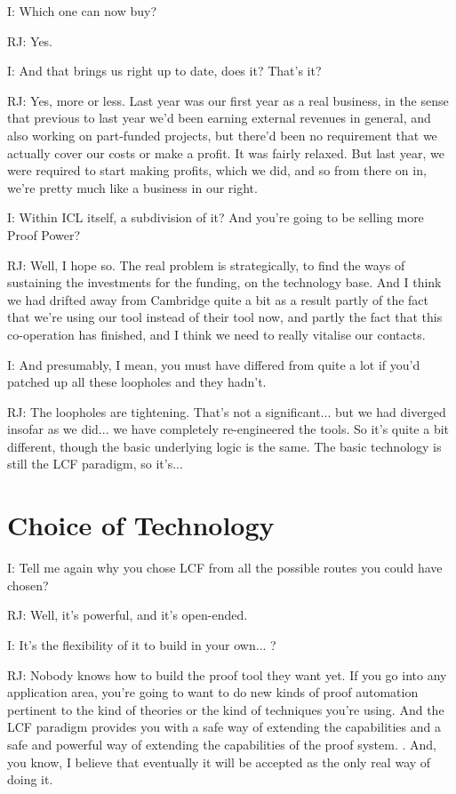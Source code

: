 \documentclass[10pt,titlepage]{book}
\begin{document}
I: Which one can now buy?

RJ: Yes.

I: And that brings us right up to date, does it?
That's it?


RJ: Yes, more or less. Last year was our first year as a real business, in the sense that  previous to last year we'd been earning external revenues in general, and also working on part-funded projects, but there'd been no requirement that we actually cover our costs or make a profit. It was fairly relaxed. But last year, we were required to start making profits, which we did, and so from there on in, we're pretty much like a business in our right.

I: Within ICL itself, a subdivision of it?
And you're going to be selling more Proof Power?

RJ: Well, I hope so.
The real problem is strategically, to find the ways of sustaining the investments for the funding, on the technology base.
And I think we had drifted away from Cambridge quite a bit as a result partly of the fact that we're using our tool instead of their tool now, and partly the fact that this co-operation has finished, and I think we need to really vitalise our contacts.

I: And presumably, I mean, you must have differed from quite a lot if you'd patched up all these loopholes and they hadn't.

RJ: The loopholes are tightening.
That's not a significant... but we had diverged insofar as we did... we have completely re-engineered the tools.
So it's quite a bit different, though the basic underlying logic is the same.
The basic technology is still the LCF paradigm, so it's...

\section{Choice of Technology}

I: Tell me again why you chose LCF from all the possible routes you could have chosen?

RJ: Well, it's powerful, and it's open-ended.

I: It's the flexibility of it to build in your own... ?

RJ: Nobody knows how to build the proof tool they want yet. If you go into any application area, you're going to want to do new kinds of proof automation pertinent to the kind of theories or the kind of techniques you're using. And the LCF paradigm provides you with a safe way of extending the capabilities and a safe and powerful way of extending the capabilities of the proof system. 		. And, you know, I believe that eventually it will be accepted as the only real way of doing it.
\end{document}
